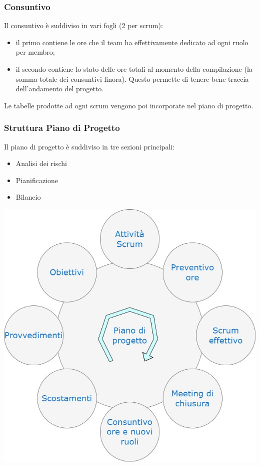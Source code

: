 \subsubsection*{Consuntivo}
Il consuntivo è suddiviso in vari fogli (2 per scrum):
\begin{itemize}
    \item il primo contiene le ore che il team ha effettivamente dedicato ad ogni ruolo per membro;
    \item il secondo contiene lo stato delle ore totali al momento della compilazione (la somma totale dei consuntivi finora). Questo permette di tenere bene traccia dell'andamento del progetto.
\end{itemize}
Le tabelle prodotte ad ogni scrum vengono poi incorporate nel piano di progetto.

\subsubsection{Struttura Piano di Progetto}

Il piano di progetto è suddiviso in tre sezioni principali:

\begin{itemize}
    \item Analisi dei rischi
    \item Pianificazione
    \item Bilancio
\end{itemize}

\begin{center}
\includegraphics[scale = 0.40]{img/workflow.jpg}
\end{center}

